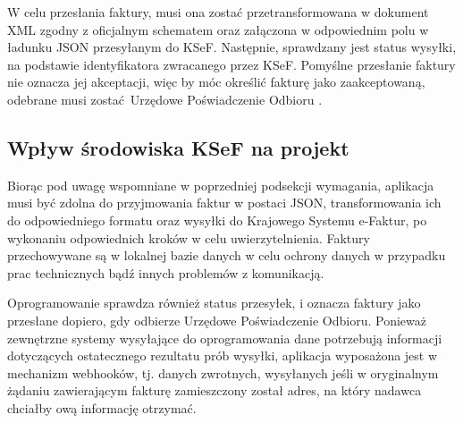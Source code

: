 W celu przesłania faktury, musi ona zostać przetransformowana w dokument XML zgodny z oficjalnym schematem oraz załączona w odpowiednim polu w ładunku JSON przesyłanym do KSeF. Następnie, sprawdzany jest status wysyłki, na podstawie identyfikatora zwracanego przez KSeF. Pomyślne przesłanie faktury nie oznacza jej akceptacji, więc by móc określić fakturę jako zaakceptowaną, odebrane musi zostać Urzędowe Poświadczenie Odbioru \parencite{ksef_api_docs}.

\subsection{Wpływ środowiska KSeF na projekt}
Biorąc pod uwagę wspomniane w poprzedniej podsekcji wymagania, aplikacja musi być zdolna do przyjmowania faktur w postaci JSON, transformowania ich do odpowiedniego formatu oraz wysyłki do Krajowego Systemu e-Faktur, po wykonaniu odpowiednich kroków w celu uwierzytelnienia. Faktury przechowywane są w lokalnej bazie danych w celu ochrony danych w przypadku prac technicznych bądź innych problemów z komunikacją. 

Oprogramowanie sprawdza również status przesyłek, i oznacza faktury jako przesłane dopiero, gdy odbierze Urzędowe Poświadczenie Odbioru. Ponieważ zewnętrzne systemy wysyłające do oprogramowania dane potrzebują informacji dotyczących ostatecznego rezultatu prób wysyłki, aplikacja wyposażona jest w mechanizm webhooków, tj. danych zwrotnych, wysyłanych jeśli w oryginalnym żądaniu zawierającym fakturę zamieszczony został adres, na który nadawca chciałby ową informację otrzymać.
